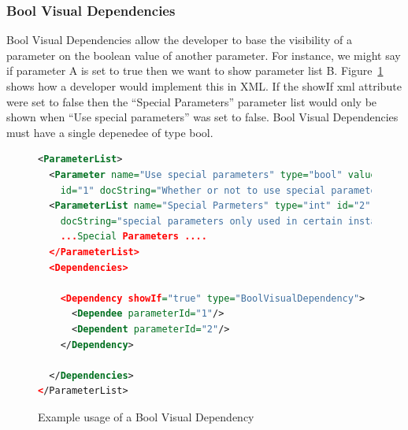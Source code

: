 \subsubsection{Bool Visual Dependencies}
Bool Visual Dependencies allow the developer to base the visibility of a parameter on the boolean value of another parameter. For instance, we might say
if parameter A is set to true then we want to show parameter list B. Figure~\ref{BoolVisXML} shows how a developer would implement this in XML. If the
showIf xml attribute were set to false then the ``Special Parameters'' parameter list would only be shown when ``Use special parameters'' was set to false.
Bool Visual Dependencies must have a single depenedee of type bool.
\begin{figure}
\centering
\begin{lstlisting}[language=XML]
<ParameterList>
  <Parameter name="Use special parameters" type="bool" value="true"
    id="1" docString="Whether or not to use special parameters"/>
  <ParameterList name="Special Parmeters" type="int" id="2"
    docString="special parameters only used in certain instances" 
    ...Special Parameters ....
  </ParameterList>
  <Dependencies>

    <Dependency showIf="true" type="BoolVisualDependency">
      <Dependee parameterId="1"/>
      <Dependent parameterId="2"/>
    </Dependency>

  </Dependencies>
</ParameterList>
\end{lstlisting}
\caption{Example usage of a Bool Visual Dependency}
\label{BoolVisXML}
\end{figure}

